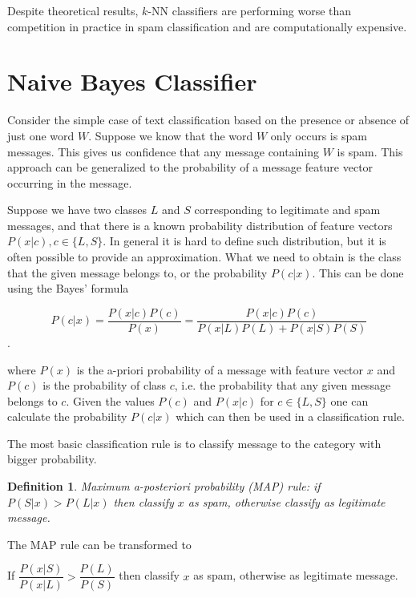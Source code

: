 \documentclass[12pt]{report}
\newtheorem{definition}{Definition}[section]
\begin{document}
Despite theoretical results, $k$-NN classifiers are performing worse than competition in practice in spam classification and are computationally expensive.

\newpage

\section{Naive Bayes Classifier}

Consider the simple case of text classification based on the presence or absence of just one word $W$. Suppose we know that the word $W$ only occurs is spam messages. This gives us confidence that any message containing $W$ is spam. This approach can be generalized to the probability of a message feature vector occurring in the message.

Suppose we have two classes $L$ and $S$ corresponding to legitimate and spam messages, and that there is a known probability distribution of feature vectors $P(x | c), c \in \{L, S\}$. In general it is hard to define such distribution, but it is often possible to provide an approximation. What we need to obtain is the class that the given message belongs to, or the probability $P(c | x)$. This can be done using the Bayes' formula

$$P(c | x) = \dfrac{P(x | c) P(c)}{P(x)} = \dfrac{P(x | c) P(c)}{P(x | L) P(L) + P(x | S) P(S)}$$.

where $P(x)$ is the a-priori probability of a message with feature vector $x$ and $P(c)$ is the probability of class $c$, i.e. the probability that any given message belongs to $c$. Given the values $P(c)$ and $P(x | c)$ for $c \in \{L, S\}$ one can calculate the probability $P(c | x)$ which can then be used in a classification rule.

The most basic classification rule is to classify message to the category with bigger probability.

\begin{definition}
	Maximum a-posteriori probability (MAP) rule: if $P(S | x) > P(L | x)$ then classify $x$ as spam, otherwise classify as legitimate message.
\end{definition}

The MAP rule can be transformed to

\begin{center}
	If $\dfrac{P(x | S)}{P(x | L)} > \dfrac{P(L)}{P(S)}$ then classify $x$ as spam, otherwise as legitimate message.
\end{center}
\end{document}
